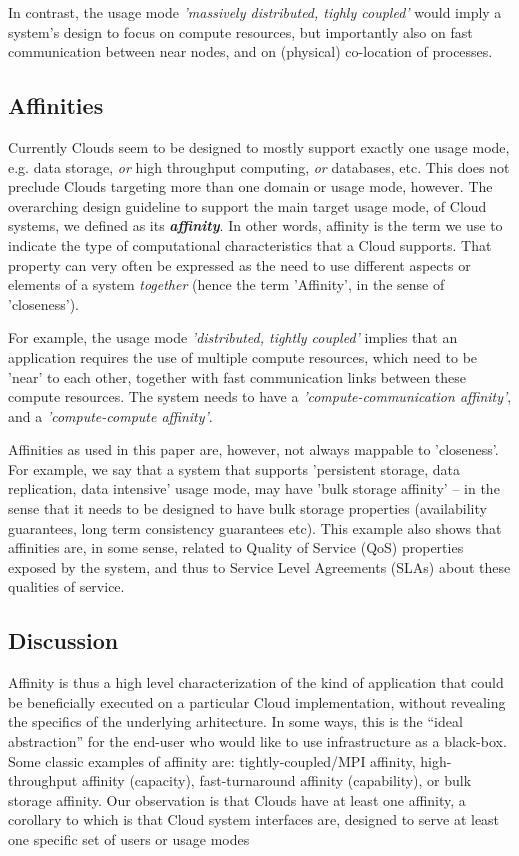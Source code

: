 \documentclass[conference,final]{IEEEtran}
\newcommand{\I}[1]{\textit{#1}}
\newcommand{\BI}[1]{\textbf{\textit{#1}}}
\begin{document}
  In contrast, the usage mode \I{'massively distributed, tighly
  coupled'} would imply a system's design to focus on compute
  resources, but importantly also on fast communication between near
  nodes, and on (physical) co-location of processes.


 \subsection{Affinities}

  Currently Clouds seem to be designed to mostly support exactly one
  usage mode, e.g.  data storage, \I{or} high throughput computing,
  \I{or} databases, etc.  This does not preclude Clouds targeting more
  than one domain or usage mode, however.  The overarching design
  guideline to support the main target usage mode, of Cloud systems,
  we defined as its \BI{affinity}.  In other words, affinity is the
  term we use to indicate the type of computational characteristics
  that a Cloud supports.  That property can very often be expressed as
  the need to use different aspects or elements of a system
  \I{together} (hence the term 'Affinity', in the sense of
  'closeness').  

  For example, the usage mode \I{'distributed, tightly coupled'}
  implies that an application requires the use of multiple compute
  resources, which need to be 'near' to each other, together with fast
  communication links between these compute resources.  The system
  needs to have a \I{'compute-communication affinity'}, and a
  \I{'compute-compute affinity'}.

  Affinities as used in this paper are, however, not always mappable
  to 'closeness'.  For example, we say that a system that supports
  'persistent storage, data replication, data intensive' usage mode,
  may have 'bulk storage affinity' -- in the sense that it needs to be
  designed to have bulk storage properties (availability guarantees,
  long term consistency guarantees etc).  This example also shows that
  affinities are, in some sense, related to Quality of Service (QoS)
  properties exposed by the system, and thus to Service Level
  Agreements (SLAs) about these qualities of service.


 \subsection{Discussion}

  Affinity is thus a high level characterization of the kind of
  application that could be beneficially executed on a particular
  Cloud implementation, without revealing the specifics of the
  underlying arhitecture. In some ways, this is the ``ideal
  abstraction'' for the end-user who would like to use infrastructure
  as a black-box.  Some classic examples of affinity are:
  tightly-coupled/MPI affinity, high-throughput affinity (capacity),
  fast-turnaround affinity (capability), or bulk storage affinity.
  Our observation is that Clouds have at least one affinity, a
  corollary to which is that Cloud system interfaces are, designed to
  serve at least one specific set of users or usage modes
\end{document}
